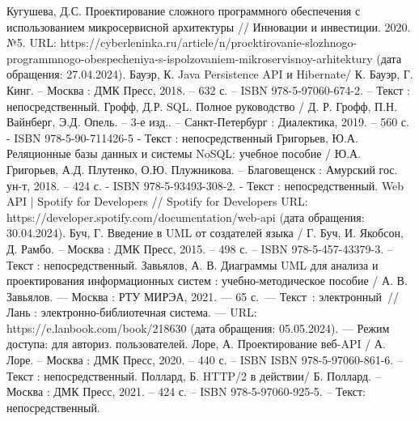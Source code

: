 \begin{thebibliography}{9}
     Кугушева, Д.С. Проектирование сложного программного обеспечения с использованием микросервисной архитектуры // Инновации и инвестиции. 2020. №5. URL: https://cyberleninka.ru/article/n/proektirovanie-slozhnogo-programmnogo-obespecheniya-s-ispolzovaniem-mikroservisnoy-arhitektury (дата обращения: 27.04.2024).
     Бауэр, К. Java Persistence API и Hibernate/ К. Бауэр, Г. Кинг. – Москва : ДМК Пресс, 2018. – 632 с. – ISBN 978-5-97060-674-2. – Текст : непосредственный.
     Грофф, Д.Р. SQL. Полное руководство / Д. Р. Грофф, П.Н. Вайнберг, Э.Д. Опель. – 3-е изд.. – Санкт-Петербург : Диалектика, 2019. – 560 с. - ISBN 978-5-90-711426-5 - Текст : непосредственный
     Григорьев, Ю.А. Реляционные базы данных и системы NoSQL: учебное пособие / Ю.А. Григорьев, А.Д. Плутенко, О.Ю. Плужникова. – Благовещенск : Амурский гос. ун-т, 2018. – 424 с. - ISBN 978-5-93493-308-2. - Текст : непосредственный.
     Web API | Spotify for Developers // Spotify for Developers URL: https://developer.spotify.com/documentation/web-api (дата обращения: 30.04.2024).
     Буч, Г. Введение в UML от создателей языка / Г. Буч, И. Якобсон, Д. Рамбо. – Москва : ДМК Пресс, 2015. – 498 с. – ISBN 978-5-457-43379-3. – Текст : непосредственный.
     Завьялов, А. В. Диаграммы UML для анализа и проектирования информационных систем : учебно-методическое пособие / А. В. Завьялов. — Москва : РТУ МИРЭА, 2021. — 65 с. — Текст : электронный // Лань : электронно-библиотечная система. — URL: https://e.lanbook.com/book/218630 (дата обращения: 05.05.2024). — Режим доступа: для авториз. пользователей.
     Лоре, А. Проектирование веб-API / А. Лоре. – Москва : ДМК Пресс, 2020. – 440 с. – ISBN ISBN 978-5-97060-861-6. – Текст : непосредственный.
     Поллард, Б. HTTP/2 в действии/ Б. Поллард. – Москва : ДМК Пресс, 2021. – 424 с. – ISBN 978-5-97060-925-5. – Текст: непосредственный.
    
\end{thebibliography}
